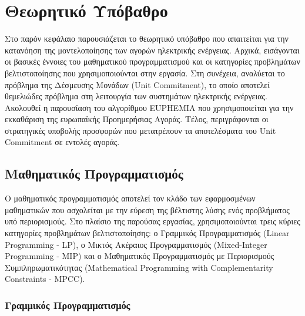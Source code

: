 % 

\chapter{Θεωρητικό Υπόβαθρο}
\label{ch:theoretical-background}

Στο παρόν κεφάλαιο παρουσιάζεται το θεωρητικό υπόβαθρο που απαιτείται για την κατανόηση της μοντελοποίησης των αγορών ηλεκτρικής ενέργειας. Αρχικά, εισάγονται οι βασικές έννοιες του μαθηματικού προγραμματισμού και οι κατηγορίες προβλημάτων βελτιστοποίησης που χρησιμοποιούνται στην εργασία. Στη συνέχεια, αναλύεται το πρόβλημα της Δέσμευσης Μονάδων (Unit Commitment), το οποίο αποτελεί θεμελιώδες πρόβλημα στη λειτουργία των συστημάτων ηλεκτρικής ενέργειας. Ακολουθεί η παρουσίαση του αλγορίθμου EUPHEMIA που χρησιμοποιείται για την εκκαθάριση της ευρωπαϊκής Προημερήσιας Αγοράς. Τέλος, περιγράφονται οι στρατηγικές υποβολής προσφορών που μετατρέπουν τα αποτελέσματα του Unit Commitment σε εντολές αγοράς.


\section{Μαθηματικός Προγραμματισμός}
\label{sec:mathematical-programming}

Ο μαθηματικός προγραμματισμός αποτελεί τον κλάδο των εφαρμοσμένων μαθηματικών που ασχολείται με την εύρεση της βέλτιστης λύσης ενός προβλήματος υπό περιορισμούς. Στο πλαίσιο της παρούσας εργασίας, χρησιμοποιούνται τρεις κύριες κατηγορίες προβλημάτων βελτιστοποίησης: ο Γραμμικός Προγραμματισμός (Linear Programming - LP), ο Μικτός Ακέραιος Προγραμματισμός (Mixed-Integer Programming - MIP) και ο Μαθηματικός Προγραμματισμός με Περιορισμούς Συμπληρωματικότητας (Mathematical Programming with Complementarity Constraints - MPCC).

\subsection{Γραμμικός Προγραμματισμός}
\label{subsec:linear-programming}

